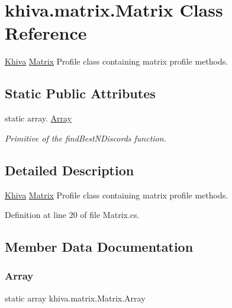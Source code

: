 \hypertarget{classkhiva_1_1matrix_1_1_matrix}{}\section{khiva.\+matrix.\+Matrix Class Reference}
\label{classkhiva_1_1matrix_1_1_matrix}


\mbox{\hyperlink{classkhiva_1_1_khiva}{Khiva}} \mbox{\hyperlink{classkhiva_1_1matrix_1_1_matrix}{Matrix}} Profile class containing matrix profile methods.  


\subsection*{Static Public Attributes}
\begin{DoxyCompactItemize}
\item 
static array. \mbox{\hyperlink{classkhiva_1_1matrix_1_1_matrix_a263a6854538f39bd68e038d667f1cc8c}{Array}}
\begin{DoxyCompactList}\small\item\em Primitive of the find\+Best\+N\+Discords function. \end{DoxyCompactList}\end{DoxyCompactItemize}


\subsection{Detailed Description}
\mbox{\hyperlink{classkhiva_1_1_khiva}{Khiva}} \mbox{\hyperlink{classkhiva_1_1matrix_1_1_matrix}{Matrix}} Profile class containing matrix profile methods. 



Definition at line 20 of file Matrix.\+cs.



\subsection{Member Data Documentation}
\mbox{\label{classkhiva_1_1matrix_1_1_matrix_a263a6854538f39bd68e038d667f1cc8c}} 
\subsubsection{\texorpdfstring{Array}{Array}}
{\footnotesize\ttfamily static array khiva.\+matrix.\+Matrix.\+Array\hspace{0.3cm}{\ttfamily [static]}}



